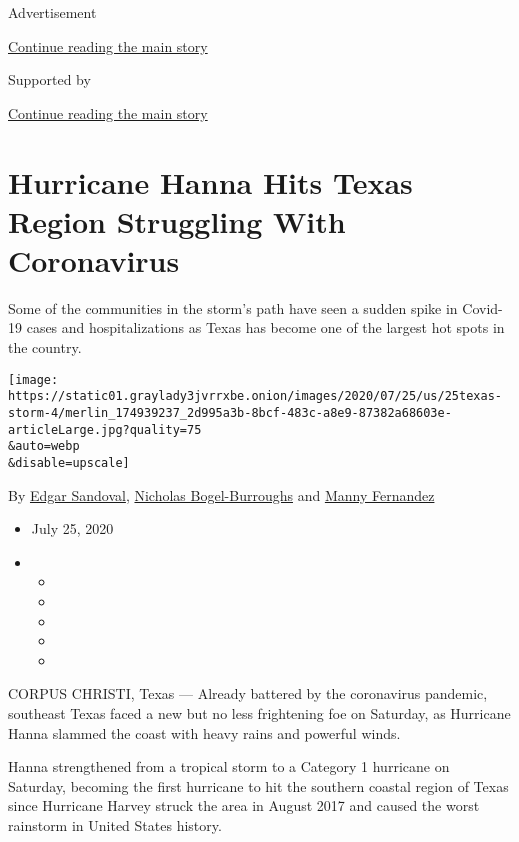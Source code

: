 Advertisement

\protect\hyperlink{after-top}{Continue reading the main story}

Supported by

\protect\hyperlink{after-sponsor}{Continue reading the main story}

\hypertarget{hurricane-hanna-hits-texas-region-struggling-with-coronavirus}{%
\section{Hurricane Hanna Hits Texas Region Struggling With
Coronavirus}\label{hurricane-hanna-hits-texas-region-struggling-with-coronavirus}}

Some of the communities in the storm's path have seen a sudden spike in
Covid-19 cases and hospitalizations as Texas has become one of the
largest hot spots in the country.

\texttt{[image: https://static01.graylady3jvrrxbe.onion/images/2020/07/25/us/25texas-storm-4/merlin\_174939237\_2d995a3b-8bcf-483c-a8e9-87382a68603e-articleLarge.jpg?quality=75\\\&auto=webp\\\&disable=upscale]}

By \href{https://www.nytimes3xbfgragh.onion/by/edgar-sandoval}{Edgar
Sandoval},
\href{https://www.nytimes3xbfgragh.onion/by/nicholas-bogel-burroughs}{Nicholas
Bogel-Burroughs} and
\href{https://www.nytimes3xbfgragh.onion/by/manny-fernandez}{Manny
Fernandez}

\begin{itemize}
\item
  July 25, 2020
\item
  \begin{itemize}
  \item
  \item
  \item
  \item
  \item
  \end{itemize}
\end{itemize}

CORPUS CHRISTI, Texas --- Already battered by the coronavirus pandemic,
southeast Texas faced a new but no less frightening foe on Saturday, as
Hurricane Hanna slammed the coast with heavy rains and powerful winds.

Hanna strengthened from a tropical storm to a Category 1 hurricane on
Saturday, becoming the first hurricane to hit the southern coastal
region of Texas since Hurricane Harvey struck the area in August 2017
and caused the worst rainstorm in United States history.

